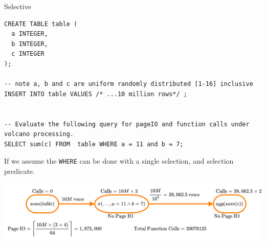 \begin{examplebox}{Selective}
  \begin{verbatim}
CREATE TABLE table (
  a INTEGER,
  b INTEGER,
  c INTEGER
);

-- note a, b and c are uniform randomly distributed [1-16] inclusive 
INSERT INTO table VALUES /* ...10 million rows*/ ;


-- Evaluate the following query for pageIO and function calls under volcano processing.
SELECT sum(c) FROM  table WHERE a = 11 and b = 7;
  \end{verbatim}
  \tcblower
  If we assume the \texttt{WHERE} can be done with a single selection, and selection predicate.
  \begin{center}
    \includegraphics[width=\textwidth]{processing_models/images/example_basic_selection.drawio.png}
  \end{center}
\end{examplebox}

